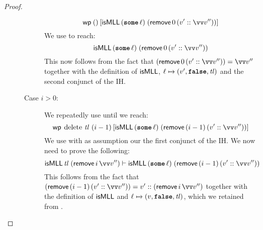 \documentclass[thesis.tex]{subfiles}
\begin{document}
\begin{proof}
\begin{description}
\begin{description}
                        \[
                            \wpre{()}{\isMLL\, (\Some \loc)\; (\textlog{remove}\, 0\, (\val' :: \vect{\val}''))}
                        \]
                        We use  to reach:
                        \[
                            \isMLL\, (\Some \loc)\; (\textlog{remove}\, 0\, (\val' :: \vect{\val}''))
                        \]
                        This now follows from the fact that $(\textlog{remove}\, 0\, (\val' :: \vect{\val}'')) = \vect{\val}''$ together with the definition of $\textsf{\upshape isMLL}$, $\loc \fmapsto (\val', \False, \tl)$ and the second conjunct of the IH.
                  \item[Case $i > 0$:] We repeatedly use  until we reach:
                        \[
                            \wpre{\MLLdelete\,\tl\ (\iindex - 1)}{\isMLL\, (\Some \loc)\; (\textlog{remove}\, (\iindex - 1)\, (\val' :: \vect{\val}''))}
                        \]
                        We use  with as assumption our the first conjunct of the IH. We now need to prove the following:
                        \[\isMLL\, \tl\; (\textlog{remove}\, \iindex\, \vect{\val}'') \proves \isMLL\, (\Some \loc)\; (\textlog{remove}\, (\iindex - 1)\, (\val' :: \vect{\val}''))\]
                        This follows from the fact that $(\textlog{remove}\, (\iindex - 1)\, (\val' :: \vect{\val}'')) = \val' :: (\textlog{remove}\, \iindex\, \vect{\val}'')$ together with the definition of $\textsf{\upshape isMLL}$ and $\loc \fmapsto (\val, \False, \tl)$, which we retained from . \qedhere
              \end{description}
    \end{description}
\end{proof}
\end{document}

